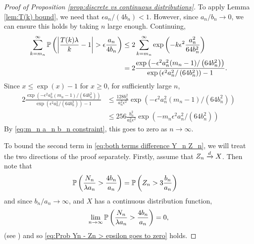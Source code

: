 \begin{proof}[Proof of Proposition \ref{prop:discrete vs continuous distributions}]
		To apply Lemma \ref{lem:T(k) bound}, we need that $\epsilon a_n / (4b_n) < 1$. However, since $a_n/b_n \rightarrow 0$, we can ensure this holds by taking $n$ large enough. %
		Continuing,
		\begin{align}
			\sum_{k = m_n}^\infty \mathbb{P}\left(\left|\frac{T(k)\lambda}{k} - 1\right| > \epsilon\frac{a_n}{4 b_n} \right) &\leq 2 \sum_{k = m_n}^\infty \exp\left(-k \epsilon^2 \frac{a_n^2}{64b_n^2}\right)\\
			&= 2 \frac{\exp\left(-\epsilon^2 a_n^2 (m_n-1) /\left(64b_n^2\right)\right)}{\exp\left(\epsilon^2 a_n^2/\left(64b_n^2\right)\right) - 1}.
		\end{align}
		Since $x \leq \exp(x) - 1$ for $x \geq 0$, for sufficiently large $n$,
		\begin{align}
		2 \frac{\exp\left(-\epsilon^2 a_n^2 (m_n-1) /\left(64b_n^2\right)\right)}{\exp\left(\epsilon^2 a_n^2/\left(64b_n^2\right)\right) - 1} &\leq \frac{128 b_n^2}{a_n^2 \epsilon^2} \exp\left(-\epsilon^2 a_n^2 (m_n-1) /\left(64b_n^2\right)\right)\\
		&\leq 256 \frac{b_n^2}{a_n^2 \epsilon^2} \exp\left(-m_n \epsilon^2 a_n^2/\left(64b_n^2\right)\right)
		\end{align}
		By \eqref{eq:m_n a_n b_n constraint}, this goes to zero as $n \rightarrow \infty$.

		To bound the second term in \eqref{eq:both terms difference Y_n Z_n}, we will treat the two directions of the proof separately. Firstly, assume that $Z_n \xrightarrow{d} X$. Then note that
		\begin{align}
			\mathbb{P}\left(\frac{N_n}{\lambda a_n} > \frac{4 b_n}{a_n} \right) &= \mathbb{P}\left(Z_n > 3\frac{b_n}{a_n} \right)
		\end{align}
		and since $b_n / a_n \rightarrow \infty$, and $X$ has a continuous distribution function,
		\begin{equation}
			\lim_{n\rightarrow \infty} \mathbb{P}\left(\frac{N_n}{\lambda a_n} > \frac{4 b_n}{a_n} \right) = 0,
		\end{equation}
		(see \cite[Theorem 14.2, Lemma 2]{Billingsley1995-en}) and so \eqref{eq:Prob Yn - Zn > epsilon goes to zero} holds.


\end{proof}
